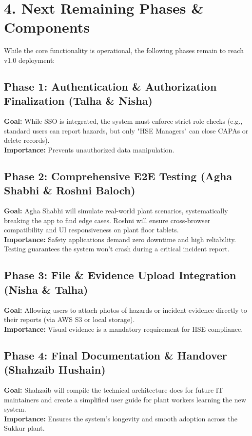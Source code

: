 \documentclass[12pt,a4paper]{article}
\begin{document}
\section*{4. Next Remaining Phases \& Components}
While the core functionality is operational, the following phases remain to reach v1.0 deployment:

\subsection*{Phase 1: Authentication \& Authorization Finalization (Talha \& Nisha)}
\textbf{Goal:} While SSO is integrated, the system must enforce strict role checks (e.g., standard users can report hazards, but only "HSE Managers" can close CAPAs or delete records). \\
\textbf{Importance:} Prevents unauthorized data manipulation.

\subsection*{Phase 2: Comprehensive E2E Testing (Agha Shabhi \& Roshni Baloch)}
\textbf{Goal:} Agha Shabhi will simulate real-world plant scenarios, systematically breaking the app to find edge cases. Roshni will ensure cross-browser compatibility and UI responsiveness on plant floor tablets. \\
\textbf{Importance:} Safety applications demand zero downtime and high reliability. Testing guarantees the system won't crash during a critical incident report.

\subsection*{Phase 3: File \& Evidence Upload Integration (Nisha \& Talha)}
\textbf{Goal:} Allowing users to attach photos of hazards or incident evidence directly to their reports (via AWS S3 or local storage). \\
\textbf{Importance:} Visual evidence is a mandatory requirement for HSE compliance.

\subsection*{Phase 4: Final Documentation \& Handover (Shahzaib Hushain)}
\textbf{Goal:} Shahzaib will compile the technical architecture docs for future IT maintainers and create a simplified user guide for plant workers learning the new system. \\
\textbf{Importance:} Ensures the system's longevity and smooth adoption across the Sukkur plant.
\end{document}
